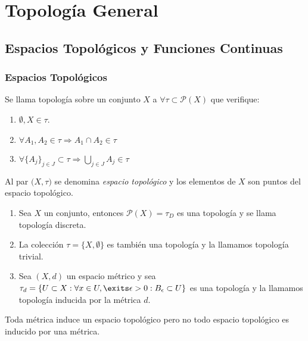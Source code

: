 \part{Topología General}
\chapter{Espacios Topológicos y Funciones Continuas}
\section{Espacios Topológicos}

\begin{defn}[Topología]
  Se llama topología sobre un conjunto $X$ a $\forall \tau \subset \mathcal{P}(X)$ que verifique:
  \begin{enumerate}[label=(\roman*)]
    \item $\emptyset,X \in \tau$.
    \item $\forall A_{1}, A_{2} \in \tau \Rightarrow A_{1}\cap A_{2} \in \tau$
    \item $\forall \{ A_{j} \}_{j \in J} \subset \tau \Rightarrow \bigcup_{j \in J} A_{j} \in \tau$
  \end{enumerate}
\end{defn}

\begin{obs}
  Al par $\big( X, \tau \big)$ se denomina \textit{espacio topológico} y los elementos de $X$ son puntos del espacio topológico.
\end{obs}

\begin{ejm}
  \begin{enumerate}[label=(\roman*)]
    \item   Sea $X$ un conjunto, entonces $\mathcal{P}(X) = \tau_{D}$ es una topología y se llama topología discreta.
    \item  La colección $\tau = \{ X, \emptyset \}$ es también una topología y la llamamos topología trivial.
    \item Sea $(X, d)$ un espacio métrico y sea $\tau_{d} = \{ U \subset X : \forall x \in U, \exits \epsilon > 0 : B_{\epsilon} \subset U \}$ es una topología y la llamamos topología inducida por la métrica $d$.
  \end{enumerate}
\end{ejm}

\begin{obs}
  Toda métrica induce un espacio topológico pero no todo espacio topológico es inducido por una métrica.
\end{obs}

